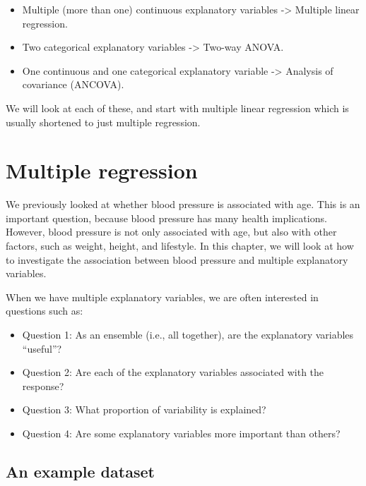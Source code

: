 \documentclass[
  letterpaper,
  8pt,
  a4paper]{book}
\providecommand{\tightlist}{%
  \setlength{\itemsep}{0pt}\setlength{\parskip}{0pt}}
\begin{document}
\begin{itemize}
\tightlist
\item
  Multiple (more than one) continuous explanatory variables
  -\textgreater{} Multiple linear regression.
\item
  Two categorical explanatory variables -\textgreater{} Two-way ANOVA.
\item
  One continuous and one categorical explanatory variable
  -\textgreater{} Analysis of covariance (ANCOVA).
\end{itemize}

We will look at each of these, and start with multiple linear regression
which is usually shortened to just multiple regression.

\section*{Multiple regression}\label{multiple-regression}


We previously looked at whether blood pressure is associated with age.
This is an important question, because blood pressure has many health
implications. However, blood pressure is not only associated with age,
but also with other factors, such as weight, height, and lifestyle. In
this chapter, we will look at how to investigate the association between
blood pressure and multiple explanatory variables.

When we have multiple explanatory variables, we are often interested in
questions such as:

\begin{itemize}
\tightlist
\item
  Question 1: As an ensemble (i.e., all together), are the explanatory
  variables ``useful''?
\item
  Question 2: Are each of the explanatory variables associated with the
  response?
\item
  Question 3: What proportion of variability is explained?
\item
  Question 4: Are some explanatory variables more important than others?
\end{itemize}

\subsection*{An example dataset}\label{an-example-dataset}
\end{document}
